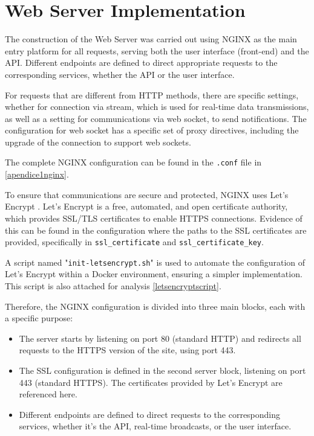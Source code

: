 \section{Web Server Implementation}\label{sec:webserverimpl}
The construction of the Web Server was carried out using NGINX \cite{nginxDocs} as the main entry platform for all requests, serving both the user interface (front-end) and the API. Different endpoints are defined to direct appropriate requests to the corresponding services, whether the API or the user interface.

For requests that are different from HTTP methods, there are specific settings, whether for connection via stream, which is used for real-time data transmissions, as well as a setting for communications via web socket, to send notifications. The configuration for web socket has a specific set of proxy directives, including the upgrade of the connection to support web sockets.

The complete NGINX configuration can be found in the \texttt{.conf} file in \ref{apendice1nginx}.

To ensure that communications are secure and protected, NGINX uses Let's Encrypt \cite{letsencrypt2023}. Let's Encrypt is a free, automated, and open certificate authority, which provides SSL/TLS certificates to enable HTTPS connections. Evidence of this can be found in the configuration where the paths to the SSL certificates are provided, specifically in \texttt{ssl\_certificate} and \texttt{ssl\_certificate\_key}.


A script named "\texttt{init-letsencrypt.sh}" is used to automate the configuration of Let's Encrypt within a Docker environment, ensuring a simpler implementation. This script is also attached for analysis \ref{letsencryptscript}.

Therefore, the NGINX configuration is divided into three main blocks, each with a specific purpose:

\begin{itemize}
    \item The server starts by listening on port 80 (standard HTTP) and redirects all requests to the HTTPS version of the site, using port 443.
    \item The SSL configuration is defined in the second server block, listening on port 443 (standard HTTPS). The certificates provided by Let's Encrypt are referenced here.
    \item Different endpoints are defined to direct requests to the corresponding services, whether it's the API, real-time broadcasts, or the user interface.
\end{itemize}